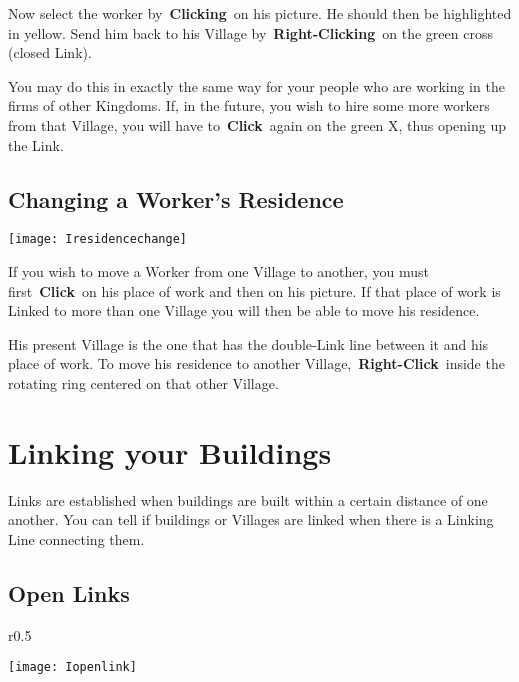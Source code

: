 Now select the worker by \textbf{Clicking} on his picture. He should then be highlighted in yellow. Send him back to his Village by \textbf{Right-Clicking} on the green cross (closed Link).

You may do this in exactly the same way for your people who are working in the firms of other Kingdoms. If, in the future, you wish to hire some more workers from that Village, you will have to \textbf{Click} again on the green X, thus opening up the Link.

\subsection{Changing a Worker’s Residence}


\begin{center}
	\texttt{[image: Iresidencechange]}
\end{center}

If you wish to move a Worker from one Village to another, you must first \textbf{Click} on his place of work and then on his picture. If that place of work is Linked to more than one Village you will then be able to move his residence.

His present Village is the one that has the double-Link line between it and his place of work. To move his residence to another Village, \textbf{Right-Click} inside the rotating ring centered on that other Village.

\section{Linking your Buildings}


Links are established when buildings are built within a certain distance of one another. You can tell if buildings or Villages are linked when there is a Linking Line connecting them.

\subsection{Open Links}


\begin{wrapfigure}{r}{0.5\textwidth}
	\vspace{-20pt}
	\begin{center}
		\texttt{[image: Iopenlink]}
	\end{center}
	\vspace{-20pt}
\end{wrapfigure}

